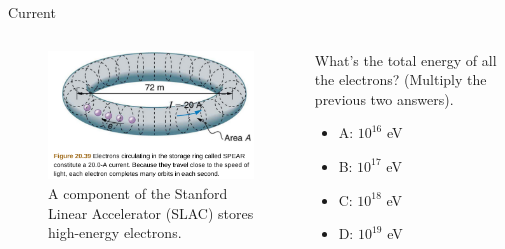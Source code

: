 \documentclass{beamer}
\begin{document}
\begin{frame}{Current}
\begin{columns}[T]
\begin{column}{0.5\textwidth}
\begin{figure}
\centering
\includegraphics[width=\textwidth]{figures/SPEAR.png}
\caption{\label{fig:SLAC3} A component of the Stanford Linear Accelerator (SLAC) stores high-energy electrons.}
\end{figure}
\end{column}
\begin{column}{0.5\textwidth}
\small
What's the total energy of all the electrons?  (Multiply the previous two answers).
\begin{itemize}
\item A: $10^{16}$ eV
\item B: $10^{17}$ eV
\item C: $10^{18}$ eV
\item D: $10^{19}$ eV
\end{itemize}
\end{column}
\end{columns}
\end{frame}
\end{document}
